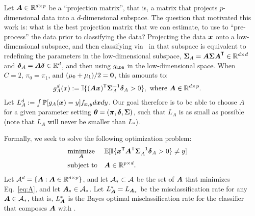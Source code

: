\documentclass[11pt]{extarticle}
\begin{document}
Let $\boldsymbol{A} \in \mathbb{R}^{d \times p}$ be a ``projection matrix'', that is, a
matrix that projects $p$-dimensional data into a $d$-dimensional subspace.
The question that motivated this work is: what is the best projection matrix that we can estimate, to use to ``pre-process'' the data prior to classifying the data?
Projecting the data $\boldsymbol{x}$ onto a low-dimensional subspace, and then classifying via \Lda~in that subspace is equivalent to redefining the parameters in the low-dimensional subspace,
$\boldsymbol{\Sigma}_A=\boldsymbol{A} \boldsymbol{\Sigma} \boldsymbol{A}^{\mathsf{T}} \in \mathbb{R}^{d \times d}$ and $\boldsymbol{\delta}_A = \boldsymbol{A} \boldsymbol{\delta} \in \mathbb{R}^d$, and then using $g_{{\texttt{LDA}}}$ in the low-dimensional space.  When $C=2$, $\pi_0=\pi_1$, and $(\mu_0+\mu_1)/2=\boldsymbol{0}$, this amounts to:
\begin{align} \label{eq:g_A}
g^d_A(x) := \mathbb{I} \{ (\boldsymbol{A} \boldsymbol{x})^{\mathsf{T}} \boldsymbol{\Sigma}^{-1}_A \boldsymbol{\delta}_A > 0\}, \text{ where } \boldsymbol{A} \in \mathbb{R}^{d \times p}.
\end{align}
Let $L^d_A :=\int \mathbb{P}[g_A(\boldsymbol{x})=y] f_{\boldsymbol{x},y} d\boldsymbol{x} dy$.
Our goal therefore is to be able to choose $A$ for a given parameter setting $\boldsymbol{\theta}=(\boldsymbol{\pi}, \boldsymbol{\delta},\boldsymbol{\Sigma})$, such that $L_A$ is as small as possible (note that $L_A$ will never be smaller than $L_*$).

Formally, we seek to solve the following optimization problem:
\begin{equation} \label{eq:A}
\begin{aligned}
& \underset{\bA}{\text{minimize}}
& & \EE [ \II \{ \bx\TT \bA\TT \bSig^{-1}_A \bdel_A > 0\} \neq y] \\
& \text{subject to} & & \bA \in \Real^{p \times d}.  %
\end{aligned}
\end{equation}
Let $\mathcal{A}^d=\{\boldsymbol{A} : \boldsymbol{A} \in \mathbb{R}^{d \times p}
\}$, and let $\mathcal{A}_* \subset \mathcal{A}$ be the set of $\boldsymbol{A}$  that minimizes Eq.~\eqref{eq:A},
and let $\boldsymbol{A}_* \in \mathcal{A}_*$.   Let $L_{\boldsymbol{A}}^*=L_{\boldsymbol{A}_*}$ be the misclassification rate for any $\boldsymbol{A} \in \mathcal{A}_*$, that is, $L_{\boldsymbol{A}}^*$ is the Bayes optimal misclassification rate for the classifier that composes $\boldsymbol{A}$ with \Lda.
\end{document}
